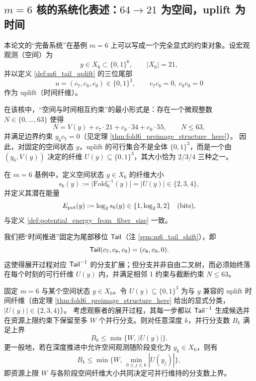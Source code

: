 \subsection{\texorpdfstring{$m=6$}{m=6} 核的系统化表述：\texorpdfstring{$64\to 21$}{64->21} 为空间，uplift 为时间}
本论文的“完备系统”在基例 \(m=6\) 上可以写成一个完全显式的约束对象。设宏观观测（空间）为
$$
y\in X_6\subset\{0,1\}^6,\qquad |X_6|=21,
$$
并以定义 \ref{def:m6_tail_uplift} 的三位尾部
$$
u=(c_7,c_8,c_9)\in\{0,1\}^3,\qquad c_7c_8=0,\ c_8c_9=0
$$
作为 uplift（时间纤维）。

在该核中，“空间与时间相互约束”的最小形式是：存在一个微观整数 \(N\in\{0,\dots,63\}\) 使得
$$
N=V(y)+c_7\cdot 21+c_8\cdot 34+c_9\cdot 55,\qquad N\le 63,
$$
并满足边界约束 \(y_6c_7=0\)（见定理 \ref{thm:fold6_preimage_structure_here}）。
因此，对固定的空间状态 \(y\)，uplift 的可行集合不是全体 \(\{0,1\}^3\)，而是一个由 \((y_6,V(y))\) 决定的纤维 \(U(y)\subseteq\{0,1\}^3\)，其大小恰为 \(2/3/4\) 三种之一。

\begin{definition}\label{def:m6_potential_energy}
在 \(m=6\) 基例中，定义空间状态 \(y\in X_6\) 的纤维大小
$$
s_6(y):=\bigl|\mathrm{Fold}_6^{-1}(y)\bigr|=\bigl|U(y)\bigr|\in\{2,3,4\},
$$
并定义其潜在能量
$$
E_{\mathrm{pot}}(y):=\log_2 s_6(y)\in\{1,\log_2 3,2\}\quad(\text{bits}),
$$
与定义 \ref{def:potential_energy_from_fiber_size} 一致。
\end{definition}

\begin{remark}
我们把“时间推进”固定为尾部移位 \(\mathsf{Tail}\)（注 \ref{rem:m6_tail_shift}），即
$$
\mathsf{Tail}(c_7,c_8,c_9)=(c_8,c_9,0).
$$
这使得展开过程对应 \(\mathsf{Tail}^{-1}\) 的分支扩展；但分支并非自由二叉树，而必须始终落在每个时刻的可行纤维 \(U(y)\) 内，并满足相邻 1 约束与截断约束 \(N\le 63\)。
\end{remark}

\begin{proposition}[资源上限 \(W\) 作用于 \(m=6\) uplift 分支的定量形式]\label{prop:energy_on_m6_uplift}
固定 \(m=6\) 与某个空间状态 \(y\in X_6\)。令 \(U(y)\subseteq\{0,1\}^3\) 为与 \(y\) 兼容的 uplift 时间纤维（由定理 \ref{thm:fold6_preimage_structure_here} 给出的显式分类，\(|U(y)|\in\{2,3,4\}\)）。
考虑观察者的展开过程，其每一步都以 \(\mathsf{Tail}^{-1}\) 生成候选并在资源上限约束下保留至多 \(W\) 个并行分支。则对任意深度 \(k\)，并行分支数 \(B_k\) 满足上界
$$
B_k \le \min\{W,\,|U(y)|\}.
$$
更一般地，若在深度推进中允许空间观测随阶段变化为 \(y_k\in X_6\)，则有
$$
B_k \le \min\{W,\,\min_{0\le j\le k}|U(y_j)|\},
$$
即资源上限 \(W\) 与各阶段空间纤维大小共同决定可并行维持的分支数上界。
\end{proposition}

